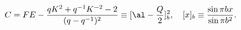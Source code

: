 \begin{equation}
C= FE -\frac{qK^{2}+q^{-1}K^{-2}-2}{(q-q^{-1})^{2}}\equiv
[\al-\frac{Q}{2}]_{b}^{2},\quad [x]_b \equiv \frac{\sin \pi bx}{\sin
\pi b^2}. \nonumber
\end{equation}

